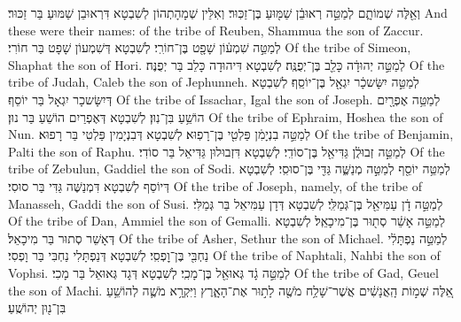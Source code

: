 {וְאֵ֖לֶּה שְׁמוֹתָ֑ם לְמַטֵּ֣ה רְאוּבֵ֔ן שַׁמּ֖וּעַ בֶּן־זַכּֽוּר׃}
{וְאִלֵּין שְׁמָהָתְהוֹן לְשִׁבְטָא דִּרְאוּבֵן שַׁמּוּעַ בַּר זַכּוּר׃}
{And these were their names: of the tribe of Reuben, Shammua the son of Zaccur.}{}
{לְמַטֵּ֣ה שִׁמְע֔וֹן שָׁפָ֖ט בֶּן־חוֹרִֽי׃}
{לְשִׁבְטָא דְּשִׁמְעוֹן שָׁפָט בַּר חוֹרִי׃}
{Of the tribe of Simeon, Shaphat the son of Hori.}{}
{לְמַטֵּ֣ה יְהוּדָ֔ה כָּלֵ֖ב בֶּן־יְפֻנֶּֽה׃}
{לְשִׁבְטָא דִּיהוּדָה כָּלֵב בַּר יְפֻנֶּה׃}
{Of the tribe of Judah, Caleb the son of Jephunneh.}{}
{לְמַטֵּ֣ה יִשָּׂשכָ֔ר יִגְאָ֖ל בֶּן־יוֹסֵֽף׃}
{לְשִׁבְטָא דְּיִשָּׂשכָר יִגְאָל בַּר יוֹסֵף׃}
{Of the tribe of Issachar, Igal the son of Joseph.}{}
{לְמַטֵּ֥ה אֶפְרָ֖יִם הוֹשֵׁ֥עַ בִּן־נֽוּן׃}
{לְשִׁבְטָא דְּאֶפְרַיִם הוֹשֵׁעַ בַּר נוּן׃}
{Of the tribe of Ephraim, Hoshea the son of Nun.}{}
{לְמַטֵּ֣ה בִנְיָמִ֔ן פַּלְטִ֖י בֶּן־רָפֽוּא׃}
{לְשִׁבְטָא דְּבִנְיָמִין פַּלְטִי בַּר רָפוּא׃}
{Of the tribe of Benjamin, Palti the son of Raphu.}{}
{לְמַטֵּ֣ה זְבוּלֻ֔ן גַּדִּיאֵ֖ל בֶּן־סוֹדִֽי׃}
{לְשִׁבְטָא דִּזְבוּלוּן גַּדִּיאֵל בַּר סוֹדִי׃}
{Of the tribe of Zebulun, Gaddiel the son of Sodi.}{}
{לְמַטֵּ֥ה יוֹסֵ֖ף לְמַטֵּ֣ה מְנַשֶּׁ֑ה גַּדִּ֖י בֶּן־סוּסִֽי׃}
{לְשִׁבְטָא דְּיוֹסֵף לְשִׁבְטָא דִּמְנַשֶּׁה גַּדִּי בַּר סוּסִי׃}
{Of the tribe of Joseph, namely, of the tribe of Manasseh, Gaddi the son of Susi.}{}
{לְמַטֵּ֣ה דָ֔ן עַמִּיאֵ֖ל בֶּן־גְּמַלִּֽי׃}
{לְשִׁבְטָא דְּדָן עַמִּיאֵל בַּר גְּמַלִּי׃}
{Of the tribe of Dan, Ammiel the son of Gemalli.}{}
{לְמַטֵּ֣ה אָשֵׁ֔ר סְת֖וּר בֶּן־מִיכָאֵֽל׃}
{לְשִׁבְטָא דְּאָשֵׁר סְתוּר בַּר מִיכָאֵל׃}
{Of the tribe of Asher, Sethur the son of Michael.}{}
{לְמַטֵּ֣ה נַפְתָּלִ֔י נַחְבִּ֖י בֶּן־וׇפְסִֽי׃}
{לְשִׁבְטָא דְּנַפְתָּלִי נַחְבִּי בַּר וָפְסִי׃}
{Of the tribe of Naphtali, Nahbi the son of Vophsi.}{}
{לְמַטֵּ֣ה גָ֔ד גְּאוּאֵ֖ל בֶּן־מָכִֽי׃}
{לְשִׁבְטָא דְּגָד גְּאוּאֵל בַּר מָכִי׃}
{Of the tribe of Gad, Geuel the son of Machi.}{}
{אֵ֚לֶּה שְׁמ֣וֹת הָֽאֲנָשִׁ֔ים אֲשֶׁר־שָׁלַ֥ח מֹשֶׁ֖ה לָת֣וּר אֶת־הָאָ֑רֶץ וַיִּקְרָ֥א מֹשֶׁ֛ה לְהוֹשֵׁ֥עַ בִּן־נ֖וּן יְהוֹשֻֽׁעַ׃
}
